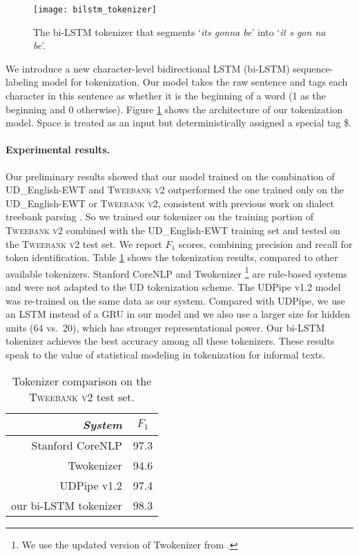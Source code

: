 \documentclass[11pt,a4paper]{article}
\begin{document}
\begin{figure}[t]
	\centering
	\texttt{[image: bilstm\_tokenizer]}
	\caption{The bi-LSTM tokenizer that segments `{\it its gonna be}' into `{\it it s gon na be}'.}\label{fig:tok-model}
\end{figure}
We introduce a new
character-level bidirectional LSTM (bi-LSTM) sequence-labeling model
\cite{DBLP:journals/corr/HuangXY15,ma-hovy:2016:P16-1}
for tokenization.
Our model takes the raw sentence and tags each character in this 
sentence as whether it is the beginning of a word (1 as the beginning and 0 otherwise).
Figure \ref{fig:tok-model} shows the architecture of our tokenization model.
Space is treated as an input but deterministically  assigned a special tag \$.

\paragraph{Experimental results.}


Our preliminary results
showed that our model trained on
the combination of UD\_English-EWT and \textsc{Tweebank v2}
outperformed the one trained only on the UD\_English-EWT or \textsc{Tweebank v2},
consistent with previous work on dialect treebank parsing \cite{wang-EtAl:2017:Long6}.
So we trained our tokenizer on the training portion of
\textsc{Tweebank v2} combined with the UD\_English-EWT training set
and tested on the \textsc{Tweebank v2} test set. We report $F_1$ scores, combining precision and recall for token identification. Table \ref{tbl:tok-result} shows the
tokenization results, compared to  other available tokenizers. 
 Stanford CoreNLP \cite{manning-EtAl:2014:P14-5} and Twokenizer
\cite{ICWSM101540}\footnote{We use the updated version of Twokenizer from \citet{owoputi-EtAl:2013:NAACL-HLT}.} are rule-based systems and were not adapted
to the UD tokenization scheme.
The UDPipe v1.2
\cite{straka-strakova:2017:K17-3} model was re-trained on the same
data as our system. Compared with UDPipe, we use an LSTM
instead of a GRU in our model and we also use a larger size for hidden units (64 vs.~20),
which has stronger representational power. 
Our bi-LSTM tokenizer achieves the best accuracy among all these
tokenizers.  These results speak to the value of statistical modeling
in tokenization for informal texts.

\begin{table}[t]
	\centering
	\begin{tabular}{rc}
\it System & $F_1$ \\
		\hline
		  Stanford CoreNLP & 97.3 \\
		 Twokenizer & 94.6 \\
\hdashline
		UDPipe v1.2 & 97.4 \\
	 	our bi-LSTM tokenizer & 98.3 \\
\end{tabular}
	\caption{Tokenizer comparison on the \textsc{Tweebank v2} test set.}\label{tbl:tok-result}
\end{table}
\end{document}
